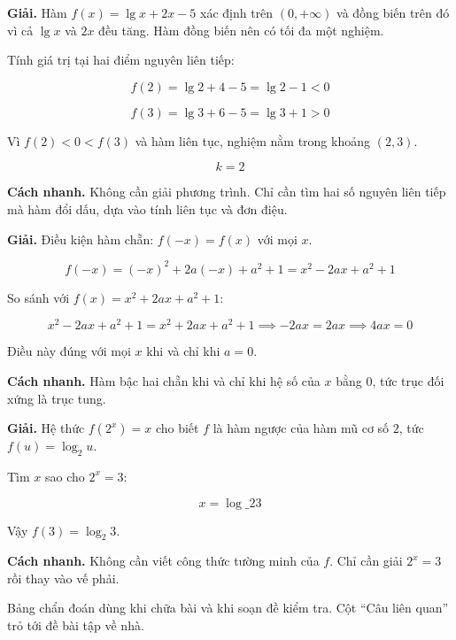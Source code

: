 \documentclass[11pt, a4paper]{article}
\begin{document}
\begin{dapan}[13 — Đáp án B]
\textbf{Giải.} Hàm $f(x) = \lg x + 2x - 5$ xác định trên $(0, +\infty)$ và đồng biến trên đó vì cả $\lg x$ và $2x$ đều tăng. Hàm đồng biến nên có tối đa một nghiệm.

Tính giá trị tại hai điểm nguyên liên tiếp:

$$f(2) = \lg 2 + 4 - 5 = \lg 2 - 1 < 0$$

$$f(3) = \lg 3 + 6 - 5 = \lg 3 + 1 > 0$$

Vì $f(2) < 0 < f(3)$ và hàm liên tục, nghiệm nằm trong khoảng $(2, 3)$.

$$k = 2$$

\textbf{Cách nhanh.} Không cần giải phương trình. Chỉ cần tìm hai số nguyên liên tiếp mà hàm đổi dấu, dựa vào tính liên tục và đơn điệu.
\end{dapan}

\begin{dapan}[14 — Đáp án C]
\textbf{Giải.} Điều kiện hàm chẵn: $f(-x) = f(x)$ với mọi $x$.

$$f(-x) = (-x)^2 + 2a(-x) + a^2 + 1 = x^2 - 2ax + a^2 + 1$$

So sánh với $f(x) = x^2 + 2ax + a^2 + 1$:

$$x^2 - 2ax + a^2 + 1 = x^2 + 2ax + a^2 + 1 \implies -2ax = 2ax \implies 4ax = 0$$

Điều này đúng với mọi $x$ khi và chỉ khi $a = 0$.

\textbf{Cách nhanh.} Hàm bậc hai chẵn khi và chỉ khi hệ số của $x$ bằng $0$, tức trục đối xứng là trục tung.
\end{dapan}

\begin{dapan}[15 — Đáp án C]
\textbf{Giải.} Hệ thức $f(2^x) = x$ cho biết $f$ là hàm ngược của hàm mũ cơ số $2$, tức $f(u) = \log_2 u$.

Tìm $x$ sao cho $2^x = 3$:

$$x = \log\_2 3$$

Vậy $f(3) = \log_2 3$.

\textbf{Cách nhanh.} Không cần viết công thức tường minh của $f$. Chỉ cần giải $2^x = 3$ rồi thay vào vế phải.
\end{dapan}

\clearpage
{}

Bảng chẩn đoán dùng khi chữa bài và khi soạn đề kiểm tra. Cột ``Câu liên quan'' trỏ tới đề bài tập về nhà.
\end{document}

